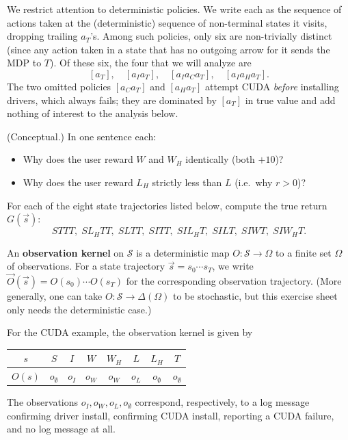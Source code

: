\documentclass[11pt]{article}
\newcommand{\cS}{\mathcal{S}}
\begin{document}
We restrict attention to deterministic policies. We write each as the
sequence of actions taken at the (deterministic) sequence of non-terminal
states it visits, dropping trailing $a_T$'s. Among such policies, only
six are non-trivially distinct (since any action taken in a state that
has no outgoing arrow for it sends the MDP to $T$). Of these six, the
four that we will analyze are
$$
[a_T], \quad [a_I a_T], \quad [a_I a_C a_T], \quad [a_I a_H a_T].
$$
The two omitted policies $[a_C a_T]$ and $[a_H a_T]$ attempt CUDA
\emph{before} installing drivers, which always fails; they are dominated
by $[a_T]$ in true value and add nothing of interest to the analysis
below.

\begin{exercise}
\label{prob:concept_setup}
(Conceptual.) In one sentence
each:
\begin{itemize}
    \item Why does the user reward $W$ and $W_H$ identically (both $+10$)?
    \item Why does the user reward $L_H$ strictly less than $L$ (i.e.\ why
        $r > 0$)?
\end{itemize}
\end{exercise}



\begin{exercise}
\label{prob:trueG}
For each of the eight state trajectories
listed below, compute the true return $G(\vec s)$:
$$
STTT,\; SL_HTT,\; SLTT,\; SITT,\; SIL_HT,\; SILT,\; SIWT,\; SIW_HT.
$$
\end{exercise}



\begin{definition}\label{def:obs}
An \textbf{observation kernel} on $\cS$ is a deterministic map
$O : \cS \to \Omega$ to a finite set $\Omega$ of observations. For a state
trajectory $\vec s = s_0 \cdots s_T$, we write
$\vec O(\vec s) = O(s_0) \cdots O(s_T)$ for the corresponding observation
trajectory. (More generally, one can take $O : \cS \to \Delta(\Omega)$ to
be stochastic, but this exercise sheet only needs the deterministic case.)
\end{definition}

For the CUDA example, the observation kernel is given by
\begin{center}
\begin{tabular}{c|ccccccc}
$s$ & $S$ & $I$ & $W$ & $W_H$ & $L$ & $L_H$ & $T$ \\\hline
$O(s)$ & $o_\emptyset$ & $o_I$ & $o_W$ & $o_W$ & $o_L$ & $o_\emptyset$ & $o_\emptyset$
\end{tabular}
\end{center}
The observations $o_I, o_W, o_L, o_\emptyset$ correspond, respectively, to a
log message confirming driver install, confirming CUDA install, reporting a
CUDA failure, and no log message at all.
\end{document}
